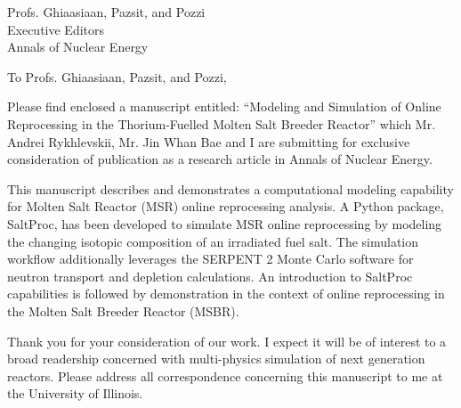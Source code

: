 \documentclass[11pt]{letter} %
\newcommand{\RecipientName}{Profs. Ghiaasiaan, Pazsit, and Pozzi\xspace}
\newcommand{\RecipientAddress}{Executive Editors\\Annals of Nuclear Energy}
\begin{document}



\begin{letter}{\RecipientName\\
        \RecipientAddress\xspace}

\address{Kathryn D. Huff\\
kdhuff@illinois.edu\\
118 Talbot Laboratory\\
104 Wright Street\\
MC-234\\
Urbana, IL 61801}


\opening{To \RecipientName,}

Please find enclosed a manuscript entitled: ``Modeling and Simulation of Online
Reprocessing in the Thorium-Fuelled Molten Salt Breeder Reactor'' which Mr. 
Andrei Rykhlevskii, Mr. Jin Whan Bae and I are submitting for exclusive consideration of 
publication as a research article in Annals of Nuclear Energy.

This manuscript describes and demonstrates a computational modeling capability
for Molten Salt Reactor (MSR) online reprocessing analysis.  A Python package,
SaltProc, has been developed to simulate MSR online reprocessing by modeling
the changing isotopic composition of an irradiated fuel salt. The simulation
workflow additionally leverages the SERPENT 2 Monte Carlo software for neutron
transport and depletion calculations. An introduction to SaltProc capabilities
is followed by demonstration in the context of online reprocessing in the
Molten Salt Breeder Reactor (MSBR).  

Thank you for your consideration of our work.  I expect it will be of interest
to a broad readership concerned with multi-physics simulation of next generation
reactors.  Please address all correspondence concerning this manuscript to me at the University of Illinois.




\end{letter}
\end{document}

